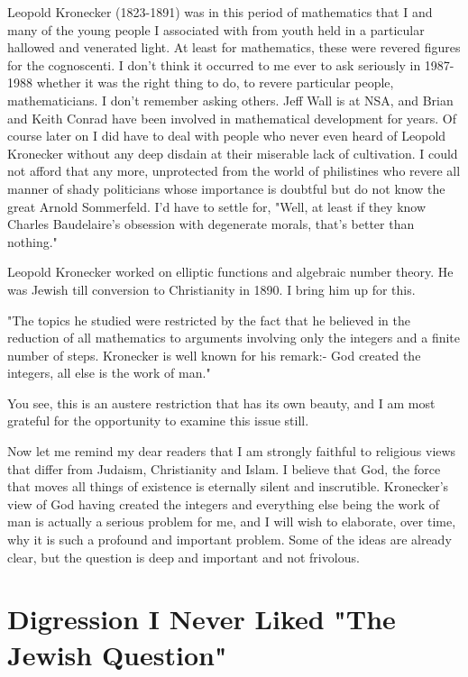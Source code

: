 \documentclass{amsart}
\begin{document}
Leopold Kronecker (1823-1891) was in this period of mathematics that I and many of the young people I associated with from youth held in a particular hallowed and venerated light.  At least for mathematics, these were revered figures for the cognoscenti.  I don't think it occurred to me ever to ask seriously in 1987-1988 whether it was the right thing to do, to revere particular people, mathematicians.  I don't remember asking others.  Jeff Wall is at NSA, and Brian and Keith Conrad have been involved in mathematical development for years.  Of course later on I did have to deal with people who never even heard of Leopold Kronecker without any deep disdain at their miserable lack of cultivation.  I could not afford that any more, unprotected from the world of philistines who revere all manner of shady politicians whose importance is doubtful but do not know the great Arnold Sommerfeld.  I'd have to settle for, "Well, at least if they know Charles Baudelaire's obsession with degenerate morals, that's better than nothing."

Leopold Kronecker worked on elliptic functions and algebraic number theory.  He was Jewish till conversion to Christianity in 1890.  I bring him up for this. 

"The topics he studied were restricted by the fact that he believed in the reduction of all mathematics to arguments involving only the integers and a finite number of steps. Kronecker is well known for his remark:-
God created the integers, all else is the work of man."

You see, this is an austere restriction that has its own beauty, and I am most grateful for the opportunity to examine this issue still.  

Now let me remind my dear readers that I am strongly faithful to religious views that differ from Judaism, Christianity and Islam.  I believe that God, the force that moves all things of existence is eternally silent and inscrutible.  Kronecker's view of God having created the integers and everything else being the work of man is actually a serious problem for me, and I will wish to elaborate, over time, why it is such a profound and important problem.  Some of the ideas are already clear, but the question is deep and important and not frivolous.

\section{Digression I Never Liked "The Jewish Question"}
\end{document}
